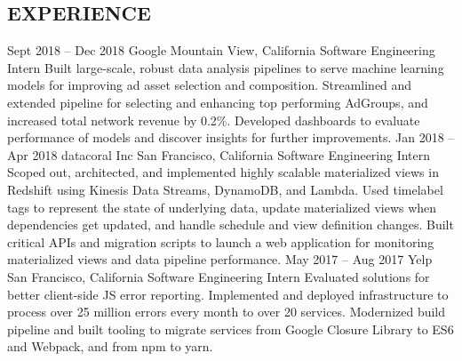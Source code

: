 \documentclass{resume}
\begin{document}
  \begin{main}
    \vspace{0.2cm}%
    \section{EXPERIENCE}
      \begin{entrylist}
        \rightentry%
          {Sept 2018 -- Dec 2018}%
          {Google}%
          {Mountain View, California}%
          {Software Engineering Intern}%
          {\createlist%
            {%
              Built large-scale, robust data analysis pipelines to serve machine learning %
              models for improving ad asset selection and composition. %
            }%
            {%
              Streamlined and extended pipeline for selecting and enhancing top performing %
              AdGroups, and increased total network revenue by 0.2\%. %
            }%
            {%
              Developed dashboards to evaluate performance of models and discover insights for %
              further improvements.
            }%
          }
        \rightentry%
          {Jan 2018 -- Apr 2018}%
          {datacoral Inc}%
          {San Francisco, California}%
          {Software Engineering Intern}%
          {\createlist%
            {%
              Scoped out, architected, and implemented highly scalable materialized views in %
              Redshift using Kinesis Data Streams, DynamoDB, and Lambda. %
            }%
            {%
              Used timelabel tags to represent the state of underlying data, update materialized %
              views when dependencies get updated, and handle schedule and view definition %
              changes. %
            }%
            {%
              Built critical APIs and migration scripts to launch a web application for monitoring %
              materialized views and data pipeline performance. %
            }%
          }
        \rightentry%
          {May 2017 -- Aug 2017}%
          {Yelp}%
          {San Francisco, California}%
          {Software Engineering Intern}%
          {\createlist%
            {%
              Evaluated solutions for better client-side JS error reporting. %
            }%
            {%
              Implemented and deployed infrastructure to process over 25 million errors every %
              month to over 20 services. %
            }%
            {%
              Modernized build pipeline and built tooling to migrate services from Google Closure %
              Library to ES6 and Webpack, and from npm to yarn. %
            }%
}
\end{entrylist}
\end{main}
\end{document}
